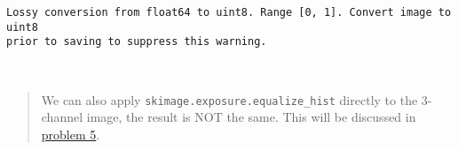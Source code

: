 \documentclass[11pt]{article}
\begin{document}
    \begin{Verbatim}[commandchars=\\\{\}]
Lossy conversion from float64 to uint8. Range [0, 1]. Convert image to uint8
prior to saving to suppress this warning.
    \end{Verbatim}

    \begin{center}
    \end{center}
    { \hspace*{\fill} \\}
    
    \begin{quote}
We can also apply \texttt{skimage.exposure.equalize\_hist} directly to
the 3-channel image, the result is NOT the same. This will be discussed
in \hyperref[problem-5-problems]{problem 5}.
\end{quote}
\end{document}
